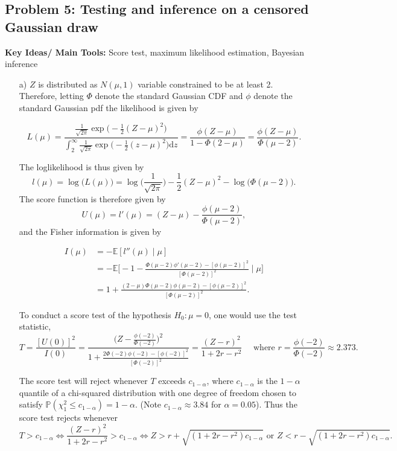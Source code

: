 \subsection*{Problem 5: Testing and inference on a censored Gaussian draw}

\textbf{Key Ideas/ Main Tools:} Score test, maximum likelihood estimation, Bayesian inference

\begin{enumerate}
\item[a)] $Z$ is distributed as $N(\mu,1)$ variable constrained to be at least 2. Therefore, letting $\Phi$ denote the standard Gaussian CDF and $\phi$ denote the standard Gaussian pdf the likelihood is given by 

$$L(\mu)  = \frac{\frac{1}{\sqrt{2 \pi} } \exp \big( -\frac{1}{2} (Z- \mu)^2 \big)}{\int_{2}^{\infty} \frac{1}{\sqrt{2 \pi} } \exp \big( -\frac{1}{2} (z- \mu)^2 \big) \text{d}z} = \frac{\phi(Z-\mu)}{1- \Phi(2-\mu)} = \frac{\phi(Z-\mu)}{\Phi(\mu-2)}.$$

The loglikelihood is thus given by $$l(\mu) = \log \big( L(\mu) \big) = \log \big( \frac{1}{\sqrt{2 \pi}} \big) -\frac{1}{2} (Z- \mu)^2  - \log \big( \Phi(\mu-2) \big).$$
The score function is therefore given by $$U(\mu) =l'(\mu) = (Z-\mu) - \frac{\phi(\mu-2)}{\Phi(\mu-2)},$$ and the Fisher information is given by 

$$\begin{aligned} I(\mu) & = -\mathbb{E}[l''(\mu) \mid \mu] \\ & = -\mathbb{E} \Big[ -1  - \frac{\Phi(\mu-2) \phi'(\mu-2)-[\phi(\mu-2)]^2}{[\Phi(\mu-2)]^2 } \mid \mu \Big] \\ & =1+\frac{(2-\mu) \Phi(\mu-2) \phi(\mu-2)-[\phi(\mu-2)]^2}{[\Phi(\mu-2)]^2}.
\end{aligned}$$

To conduct a score test of the hypothesis $H_0: \mu=0$, one would use the test statistic, $$T= \frac{[U(0)]^2}{I(0)} = \frac{\big( Z - \frac{\phi(-2)}{\Phi(-2)} \big)^2}{1+\frac{2 \Phi(-2) \phi(-2)-[\phi(-2)]^2}{[\Phi(-2)]^2}}= \frac{(Z-r)^2}{1+2r-r^2} \quad \text{ where } r=\frac{\phi(-2)}{\Phi(-2)} \approx 2.373.$$

The score test will reject whenever $T$ exceeds $c_{1-\alpha}$, where $c_{1-\alpha}$ is the $1-\alpha$ quantile of a chi-squared distribution with one degree of freedom chosen to satisfy $\mathbb{P}(\chi_1^2 \leq c_{1-\alpha} )=1-\alpha$. (Note $c_{1-\alpha} \approx 3.84$ for $\alpha=0.05$). Thus the score test rejects whenever $$ T> c_{1-\alpha} \Leftrightarrow   \frac{(Z-r)^2}{1+2r-r^2} >  c_{1-\alpha} \Leftrightarrow  Z > r+ \sqrt{(1+2r-r^2) c_{1-\alpha}}  \text { or } Z<  r- \sqrt{(1+2r-r^2) c_{1-\alpha}}.$$


\end{enumerate}
